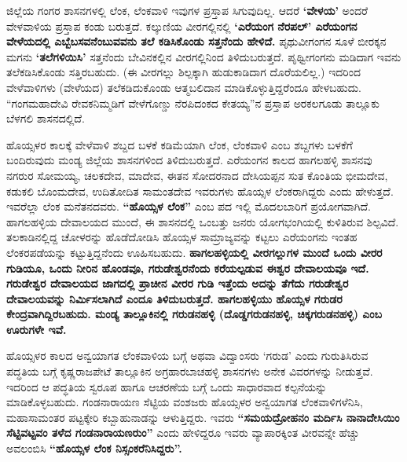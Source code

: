 ಜಿಲ್ಲೆಯ ಗಂಗರ ಶಾಸನಗಳಲ್ಲಿ ಲೆಂಕ, ಲೆಂಕವಾಳಿ ಇವುಗಳ ಪ್ರಸ್ತಾಪ ಸಿಗುವುದಿಲ್ಲ. ಆದರೆ \textbf{‘ವೇಳಯ’} ಅಂದರೆ ವೇಳವಾಳಿಯ ಪ್ರಸ್ತಾಪ ಕಂಡು ಬರುತ್ತದೆ. ಕಲ್ಕುಣಿಯ ವೀರಗಲ್ಲಿನಲ್ಲಿ \textbf{‘ಎರೆಯಂಗ ನೆರಪಲ್​’ ಎರೆಯಂಗನ ವೇಳೆಯದಲ್ಲಿ ಎಬ್ಬೆಬಸವನೆಂಬುವವನು ತಲೆ ಕಡಿಸಿಕೊಂಡು ಸತ್ತನೆಂದು ಹೇಳಿದೆ.} ಪೃಥುವೀಗಂಗನ ಸೂಳೆ ಬೀರಕ್ಕನ ಮಗನು \textbf{‘ತಲೆಗಳಿಯಿಸಿ’} ಸತ್ತನೆಂದು ಬೇವಿನಕಲ್ಲಿನ ವೀರಗಲ್ಲಿನಿಂದ ತಿಳಿದುಬರುತ್ತದೆ. ಪೃಥ್ವೀಗಂಗನು ಮಡಿದಾಗ ಇವನು ತಲೆಕಡಿಸಿಕೊಂಡು ಸತ್ತಿರಬಹುದು. (ಈ ವೀರಗಲ್ಲು ಶಿಲ್ಪಕ್ಕಾಗಿ ಹುಡುಕಾಡಿದಾಗ ದೊರೆಯಲಿಲ್ಲ.) ಇದರಿಂದ ವೇಳೆವಾಳಿಗಳು (ವೇಳೆಯದ) ತಲೆಕಡಿದುಕೊಂಡು ಆತ್ಮಬಲಿದಾನ ಮಾಡಿಕೊಳ್ಳುತ್ತಿದ್ದರೆಂದೂ ಹೇಳಬಹುದು. “ಗಂಗಮಹಾದೇವಿ ರೇವಕನಿಮ್ಮಡಿಗೆ ವೇಳೆಗೊಣ್ಡು ನೆರಪಿದಂಕದ ಕೇತಯ್ಯ”ನ ಪ್ರಸ್ತಾಪ ಅರಕಲಗೂಡು ತಾಲ್ಲೂಕು ಬೆಳಗಲಿ ಶಾಸನದಲ್ಲಿದೆ.

ಹೊಯ್ಸಳರ ಕಾಲಕ್ಕೆ ವೇಳೆವಾಳಿ ಶಬ್ದದ ಬಳಕೆ ಕಡಿಮೆಯಾಗಿ ಲೆಂಕ, ಲೆಂಕವಾಳಿ ಎಂಬ ಶಬ್ದಗಳು ಬಳಕೆಗೆ ಬಂದಿರುವುದು ಮಂಡ್ಯ ಜಿಲ್ಲೆಯ ಶಾಸನಗಳಿಂದ ತಿಳಿದುಬರುತ್ತದೆ. ಎರೆಯಂಗನ ಕಾಲದ ಹಾಗಲಹಳ್ಳಿ ಶಾಸನವು ನಗರುರ ಸೋಮಯ್ಯ, ಚಲಕದೇವ, ಮಾದೇವ, ಈತನ ಸೋದರನಾದ ದೇಸಿಯಪ್ಪನ ಸುತ ಕೊಂತಿಯ ಭೀಮದೇವ, ಕಡುಕಲಿ ಬೊಂಮದೇವ, ಉದಿತೋದಿತ ಸಾಮಂತದೇವ ಇವರುಗಳು ಹೊಯ್ಸಳ ಲೆಂಕರಾಗಿದ್ದರು ಎಂದು ಹೇಳುತ್ತದೆ. ಇವರೆಲ್ಲಾ ಲೆಂಕ ಮನೆತನದವರು. \textbf{“ಹೊಯ್ಸಳ ಲೆಂಕ”} ಎಂಬ ಪದ ಇಲ್ಲಿ ಮೊದಲಬಾರಿಗೆ ಪ್ರಯೋಗವಾಗಿದೆ. ಹಾಗಲಹಳ್ಳಿಯ ದೇವಾಲಯದ ಮುಂದೆ, ಈ ಶಾಸನದಲ್ಲಿ ಒಂಬತ್ತು ಜನರು ಯೋಗಭಂಗಿಯಲ್ಲಿ ಕುಳಿತಿರುವ ಶಿಲ್ಪವಿದೆ. ತಲಕಾಡಿನಲ್ಲಿದ್ದ ಚೋಳರನ್ನು ಹೊಡೆದೋಡಿಸಿ ಹೊಯ್ಸಳ ಸಾಮ್ರಾಜ್ಯವನ್ನು ಕಟ್ಟಲು ಎರೆಯಂಗನು ಇಂತಹ ಲೆಂಕರಪಡೆಯನ್ನು ಕಟ್ಟುತ್ತಿದ್ದನೆಂದು ಊಹಿಸಬಹುದು. \textbf{ಹಾಗಲಹಳ್ಳಿಯಲ್ಲಿ ವೀರಗಲ್ಲುಗಳ ಮುಂದೆ ಒಂದು ವೀರರ ಗುಡಿಯೂ, ಒಂದು ನೀರಿನ ಹೊಂಡವೂ, ಗರುಡೇಶ್ವರನೆಂದು ಕರೆಯಲ್ಪಡುವ ಈಶ್ವರ ದೇವಾಲಯವೂ ಇದೆ. ಗರುಡೇಶ್ವರ ದೇವಾಲಯದ ಜಾಗದಲ್ಲಿ ಪ್ರಾಚೀನ ವೀರರ ಗುಡಿ ಇತ್ತೆಂದು ಅದನ್ನು ತೆಗೆದು ಗರುಡೇಶ್ವರ ದೇವಾಲಯವನ್ನು ನಿರ್ಮಿಸಲಾಗಿದೆ ಎಂದೂ ತಿಳಿದುಬರುತ್ತದೆ. ಹಾಗಲಹಳ್ಳಿಯು ಹೊಯ್ಸಳ ಗರುಡರ ಕೇಂದ್ರವಾಗಿದ್ದಿರಬಹುದು. ಮಂಡ್ಯ ತಾಲ್ಲೂಕಿನಲ್ಲಿ ಗರುಡನಹಳ್ಳಿ (ದೊಡ್ಡಗರುಡನಹಳ್ಳಿ, ಚಿಕ್ಕಗರುಡನಹಳ್ಳಿ) ಎಂಬ ಊರುಗಳೇ ಇವೆ. }

\newpage

ಹೊಯ್ಸಳರ ಕಾಲದ ಅನ್ವಯಾಗತ ಲೆಂಕವಾಳಿಯ ಬಗ್ಗೆ ಅಥವಾ ವಿದ್ವಾಂಸರು ‘ಗರುಡ’ ಎಂದು ಗುರುತಿಸಿರುವ ಪದ್ಧತಿಯ ಬಗ್ಗೆ ಕೃಷ್ಣರಾಜಪೇಟೆ ತಾಲ್ಲೂಕಿನ ಅಗ್ರಹಾರಬಾಚಹಳ್ಳಿ ಶಾಸನಗಳು ಅನೇಕ ವಿವರಗಳನ್ನು ನೀಡುತ್ತವೆ. ಇದರಿಂದ ಆ ಪದ್ಧತಿಯ ಸ್ವರೂಪ ಹಾಗೂ ಆಚರಣೆಯ ಬಗ್ಗೆ ಒಂದು ಸಾಧಾರವಾದ ಕಲ್ಪನೆಯನ್ನು ಮಾಡಿಕೊಳ್ಳಬಹುದು. ಗಂಡನಾರಾಯಣ ಸೆಟ್ಟಿಯ ವಂಶಜರು ಹೊಯ್ಸಳರ ಅನ್ವಯಾಗತ ಲೆಂಕವಾಳಿಗಳೆನಿಸಿ, ಮಹಾಸಾಮಂತರ ಪಟ್ಟಕ್ಕೇರಿ ಕಬ್ಬಾಹುನಾಡನ್ನು ಆಳುತ್ತಿದ್ದರು. ಇವರು \textbf{“ಸಮಯದ್ರೋಹನಂ ಮರ್ದಿಸಿ ನಾನಾದೇಸಿಯಿಂ ಸೆಟ್ಟಿವಟ್ಟವಂ ತಳೆದ ಗಂಡನಾರಾಯಣರುಂ”} ಎಂದು ಹೇಳಿದ್ದರೂ ಇವರು ವ್ಯಾಪಾರಕ್ಕಿಂತ ವೀರವನ್ನೇ ಹೆಚ್ಚು ಅವಲಂಬಿಸಿ \textbf{“ಹೊಯ್ಸಳ ಲೆಂಕ ನಿಸ್ಸಂಕರೆನಿಸಿದ್ದರು”. }

